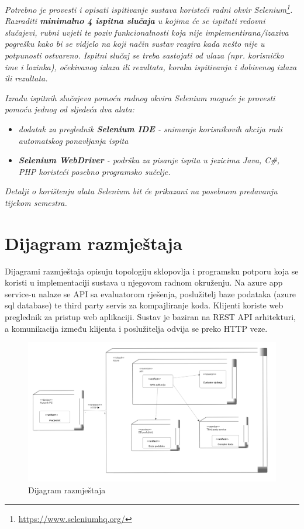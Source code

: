			 \textit{Potrebno je provesti i opisati ispitivanje sustava koristeći radni okvir Selenium\footnote{\url{https://www.seleniumhq.org/}}. Razraditi \textbf{minimalno 4 ispitna slučaja} u kojima će se ispitati redovni slučajevi, rubni uvjeti te poziv funkcionalnosti koja nije implementirana/izaziva pogrešku kako bi se vidjelo na koji način sustav reagira kada nešto nije u potpunosti ostvareno. Ispitni slučaj se treba sastojati od ulaza (npr. korisničko ime i lozinka), očekivanog izlaza ili rezultata, koraka ispitivanja i dobivenog izlaza ili rezultata.\\ }
			 
			 \textit{Izradu ispitnih slučajeva pomoću radnog okvira Selenium moguće je provesti pomoću jednog od sljedeća dva alata:}
			 \begin{itemize}
			 	\item \textit{dodatak za preglednik \textbf{Selenium IDE} - snimanje korisnikovih akcija radi automatskog ponavljanja ispita	}
			 	\item \textit{\textbf{Selenium WebDriver} - podrška za pisanje ispita u jezicima Java, C\#, PHP koristeći posebno programsko sučelje.}
			 \end{itemize}
		 	\textit{Detalji o korištenju alata Selenium bit će prikazani na posebnom predavanju tijekom semestra.}
			
			\eject 
		
		
		\section{Dijagram razmještaja}

			 Dijagrami razmještaja opisuju topologiju sklopovlja i programsku potporu koja se koristi u implementaciji sustava u njegovom radnom okruženju.
			 Na azure app service-u nalaze se API sa evaluatorom rješenja, poslužitelj baze podataka (azure sql database) te third party servis za kompajliranje koda.
			 Klijenti koriste web preglednik za pristup web aplikaciji. Sustav je baziran na REST API arhitekturi, a komunikacija između klijenta i poslužitelja odvija se preko HTTP veze.

			 
			
			\begin{figure}[H]
				\includegraphics[width=\linewidth]{slike/dijagram_razmjestaja.png} 
				\centering
				\caption{Dijagram razmještaja}
				\label{fig:razmjestaj}
			\end{figure}
			\eject 
		

